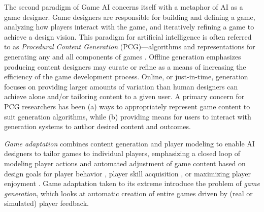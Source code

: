 \documentclass[conference]{IEEEtran}
\begin{document}
%
The second paradigm of Game AI concerns itself with a metaphor of AI as a game designer. 
Game designers are responsible for building and defining a game, analyzing how players interact with the game, and iteratively refining a game to achieve a design vision. 
%
This paradigm for artificial intelligence is often referred to as {\em Procedural Content Generation} (PCG)---algorithms and representations for generating any and all components of games \cite{hendrikx2013:pcg, togelius2011:sbpcg, yannakakis2012:gameai-revisited}.
% 
%
Offline generation emphasizes producing content designers may curate or refine as a means of increasing the efficiency of the game development process.
Online, or just-in-time, generation focuses on providing larger amounts of variation than human designers can achieve alone and/or tailoring content to a given user.
A primary concern for PCG researchers has been (a) ways to appropriately represent game content to suit generation algorithms, while (b) providing means for users to interact with generation systems to author desired content and outcomes.

{\em Game adaptation} combines content generation and player modeling to enable AI designers to tailor games to individual players, emphasizing a closed loop of modeling player actions and automated adjustment of game content based on design goals for player behavior \cite{smith2012:refraction}, player skill acquisition \cite{andersen2013:trace}, or maximizing player enjoyment \cite{yu2012:prefix-based, thue2007:storytell-pm, shaker2010:platformer-gen}.
%
Game adaptation taken to its extreme introduce the problem of {\em game generation}, which looks at automatic creation of entire games driven by (real or simulated) player feedback.
\end{document}
